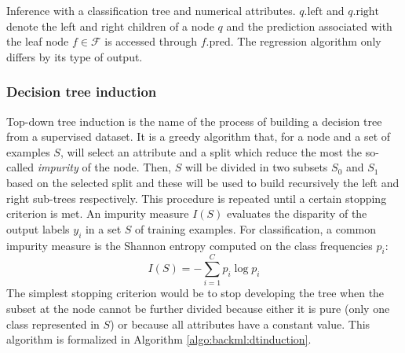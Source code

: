 \begin{algorithm}[t]
  \SetAlgoLined
  \caption{Inference with a classification tree and numerical attributes. $q.\text{left}$ and $q.\text{right}$ denote the left and right children of a node $q$ and the prediction associated with the leaf node $f \in \mathcal{F}$ is accessed through $f.\text{pred}$. The regression algorithm only differs by its type of output.}
  \label{algo:backml:dtinference}
\end{algorithm}

\subsubsection{Decision tree induction}
\label{sssec:backml:dtinduction}

Top-down tree induction is the name of the process of building a decision tree
from a supervised dataset. It is a greedy algorithm that, for a node and a
set of examples $S$, will select an attribute and a split which reduce the most
the so-called \textit{impurity} of the node. Then, $S$ will be divided in two
subsets $S_0$ and $S_1$ based on the selected split and these will be used to
build recursively the left and right sub-trees respectively. This procedure is
repeated until a certain stopping criterion is met. An impurity measure $I(S)$
evaluates the disparity of the output labels $y_i$ in a set $S$ of training
examples. For classification, a common impurity measure is the Shannon entropy
computed on the class frequencies $p_i$:
\begin{equation}
\label{eqn:backml:shannon_entropy}
I(S) = - \sum_{i=1}^C p_i \log p_i
\end{equation}
The simplest stopping criterion would be to stop developing the tree when the
subset at the node cannot be further divided because either it is pure (\eg only
one class represented in $S$) or because all attributes have a constant value.
This algorithm is formalized in Algorithm \ref{algo:backml:dtinduction}.


